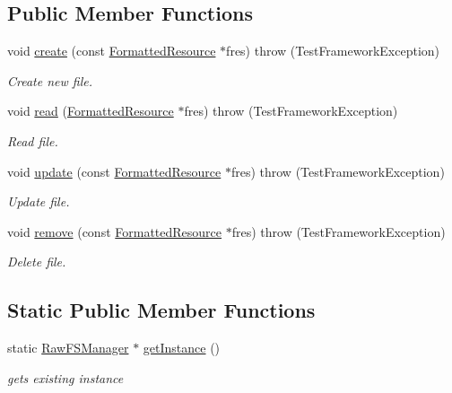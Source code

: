 \subsection*{Public Member Functions}
\begin{DoxyCompactItemize}
\item 
void \hyperlink{classit_1_1testbench_1_1ioutil_1_1RawFSManager_a4f5d15d03eb0f7de67d8fcddb83642d6}{create} (const \hyperlink{structit_1_1testbench_1_1data_1_1FormattedResource}{Formatted\-Resource} $\ast$fres)  throw (\-Test\-Framework\-Exception)
\begin{DoxyCompactList}\small\item\em Create new file. \end{DoxyCompactList}\item 
void \hyperlink{classit_1_1testbench_1_1ioutil_1_1RawFSManager_a810adf55da360932e9c3761ae5aadeac}{read} (\hyperlink{structit_1_1testbench_1_1data_1_1FormattedResource}{Formatted\-Resource} $\ast$fres)  throw (\-Test\-Framework\-Exception)
\begin{DoxyCompactList}\small\item\em Read file. \end{DoxyCompactList}\item 
void \hyperlink{classit_1_1testbench_1_1ioutil_1_1RawFSManager_a642d25f0c2a326c922583a0dc06474dd}{update} (const \hyperlink{structit_1_1testbench_1_1data_1_1FormattedResource}{Formatted\-Resource} $\ast$fres)  throw (\-Test\-Framework\-Exception)
\begin{DoxyCompactList}\small\item\em Update file. \end{DoxyCompactList}\item 
void \hyperlink{classit_1_1testbench_1_1ioutil_1_1RawFSManager_a77361c79643be5209d8705c829243b91}{remove} (const \hyperlink{structit_1_1testbench_1_1data_1_1FormattedResource}{Formatted\-Resource} $\ast$fres)  throw (\-Test\-Framework\-Exception)
\begin{DoxyCompactList}\small\item\em Delete file. \end{DoxyCompactList}\end{DoxyCompactItemize}
\subsection*{Static Public Member Functions}
\begin{DoxyCompactItemize}
\item 
static \hyperlink{classit_1_1testbench_1_1ioutil_1_1RawFSManager}{Raw\-F\-S\-Manager} $\ast$ \hyperlink{classit_1_1testbench_1_1ioutil_1_1RawFSManager_a2e71ba68b65e5dfebb90082d3883b371}{get\-Instance} ()
\begin{DoxyCompactList}\small\item\em gets existing instance \end{DoxyCompactList}\end{DoxyCompactItemize}
